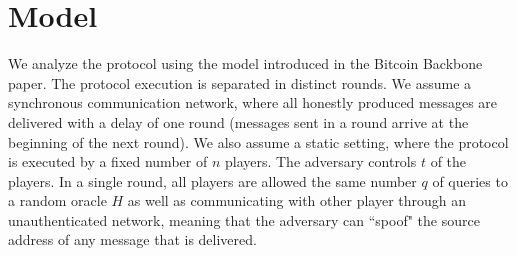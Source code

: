 \section{Model}

We analyze the protocol using the model introduced in the Bitcoin Backbone~\cite{backbone} paper.
The protocol execution is separated in distinct rounds.
We assume a synchronous communication network, where all honestly produced
messages are delivered with a delay of one round (messages sent in a round
arrive at the beginning of the next round).
We also assume a static setting, where the protocol is executed by
a fixed number of $n$ players.
The adversary controls $t$ of the players.
In a single round, all players are allowed the same number $q$ of queries to
a random oracle $H$ as well as communicating with other player through an
unauthenticated network, meaning that the adversary can ``spoof"
the source address of any message that is delivered.
